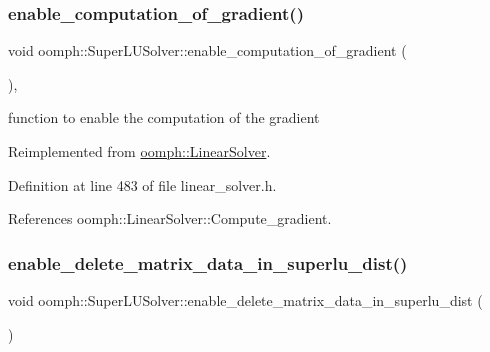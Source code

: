 \subsubsection{\texorpdfstring{enable\+\_\+computation\+\_\+of\+\_\+gradient()}{enable\_computation\_of\_gradient()}}
{\footnotesize\ttfamily void oomph\+::\+Super\+L\+U\+Solver\+::enable\+\_\+computation\+\_\+of\+\_\+gradient (\begin{DoxyParamCaption}{ }\end{DoxyParamCaption})\hspace{0.3cm}{\ttfamily [inline]}, {\ttfamily [virtual]}}



function to enable the computation of the gradient 



Reimplemented from \hyperlink{classoomph_1_1LinearSolver_a37f1f8b8c6d45115e649739abd5d2f5d}{oomph\+::\+Linear\+Solver}.



Definition at line 483 of file linear\+\_\+solver.\+h.



References oomph\+::\+Linear\+Solver\+::\+Compute\+\_\+gradient.

\mbox{\label{classoomph_1_1SuperLUSolver_a9b8487741998c97db3f41493ca427c1d}} 
\subsubsection{\texorpdfstring{enable\+\_\+delete\+\_\+matrix\+\_\+data\+\_\+in\+\_\+superlu\+\_\+dist()}{enable\_delete\_matrix\_data\_in\_superlu\_dist()}}
{\footnotesize\ttfamily void oomph\+::\+Super\+L\+U\+Solver\+::enable\+\_\+delete\+\_\+matrix\+\_\+data\+\_\+in\+\_\+superlu\+\_\+dist (\begin{DoxyParamCaption}{ }\end{DoxyParamCaption})\hspace{0.3cm}{\ttfamily [inline]}}



